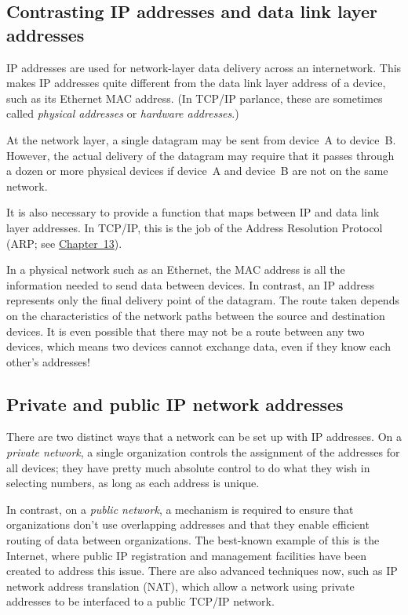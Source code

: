 \documentclass[b5paper,11pt]{memoir}
\begin{document}
\subsection{Contrasting IP addresses and data link layer addresses}

\protect\hypertarget{ch16.htmlux5cux23idx-CHP-16-0648}{}{}IP addresses
are used for network-layer data delivery across an internetwork. This
makes IP addresses quite different from the data link layer address of a
device, such as its Ethernet MAC address. (In TCP/IP parlance, these are
sometimes called {\emph{physical addresses}} or
\protect\hypertarget{ch16.htmlux5cux23idx-CHP-16-0649}{}{}{\emph{hardware
addresses}}.)

At the network layer, a single datagram may be sent from device~A to device~B.
However, the actual delivery of the datagram may require that it passes through a dozen or more physical devices if device~A and device~B are not on the same network.

It is also necessary to provide a function that maps between IP and data link layer addresses.
In TCP/IP, this is the job of the Address Resolution Protocol (ARP; see \protect\hyperlink{ch13.html}{Chapter~13}).

In a physical network such as an Ethernet, the MAC address is all the
information needed to send data between devices. In contrast, an IP
address represents only the final delivery point of the datagram. The
route taken depends on the characteristics of the network paths between
the source and destination devices. It is even possible that there may
not be a route between any two devices, which means two devices cannot
exchange data, even if they know each other's addresses!



\subsection{Private and public IP network addresses}

There are two distinct ways that a network can be set up with IP addresses.
On a {\emph{private network}}, a single organization controls the assignment of the addresses for all devices; they have pretty much absolute control to do what they wish in selecting numbers, as long as each address is unique.

In contrast, on a {\emph{public network}}, a mechanism is required to ensure that organizations don't use overlapping addresses and that they enable efficient routing of data between organizations.
The best-known example of this is the Internet, where public IP registration and management facilities have been created to address this issue.
There are also advanced techniques now, such as IP network address translation (NAT), which allow a network using private addresses to be interfaced to a public TCP/IP network.
\end{document}
